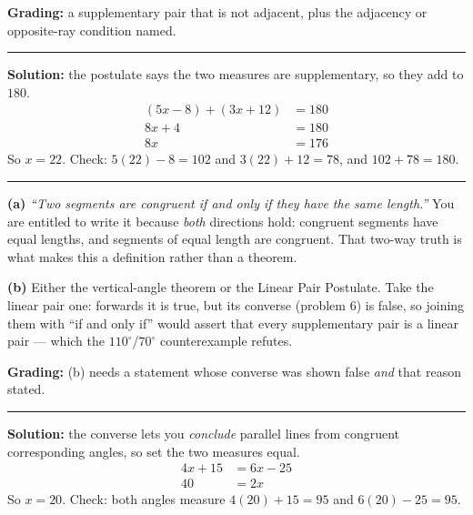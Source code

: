 \documentclass[12pt]{article}
\begin{document}
\textbf{Grading:} a supplementary pair that is not adjacent, plus the adjacency or opposite-ray condition named.

\vspace{0.2cm}\noindent\rule{\linewidth}{0.2pt}


\textbf{Solution:} the postulate says the two measures are supplementary, so they add to $180$.
\begin{align*}
  (5x - 8) + (3x + 12) &= 180 \\
  8x + 4 &= 180 \\
  8x &= 176
\end{align*}
So $x = 22$. Check: $5(22) - 8 = 102$ and $3(22) + 12 = 78$, and $102 + 78 = 180$. 

\vspace{0.2cm}\noindent\rule{\linewidth}{0.2pt}


\textbf{(a)} \emph{``Two segments are congruent if and only if they have the same length.''} You are entitled to write it because \emph{both} directions hold: congruent segments have equal lengths, and segments of equal length are congruent. That two-way truth is what makes this a definition rather than a theorem.

\textbf{(b)} Either the vertical-angle theorem or the Linear Pair Postulate. Take the linear pair one: forwards it is true, but its converse (problem 6) is false, so joining them with ``if and only if'' would assert that every supplementary pair is a linear pair --- which the $110^\circ$/$70^\circ$ counterexample refutes.

\textbf{Grading:} (b) needs a statement whose converse was shown false \emph{and} that reason stated.

\vspace{0.2cm}\noindent\rule{\linewidth}{0.2pt}


\textbf{Solution:} the converse lets you \emph{conclude} parallel lines from congruent corresponding angles, so set the two measures equal.
\begin{align*}
  4x + 15 &= 6x - 25 \\
  40 &= 2x
\end{align*}
So $x = 20$. Check: both angles measure $4(20) + 15 = 95$ and $6(20) - 25 = 95$. 
\end{document}
